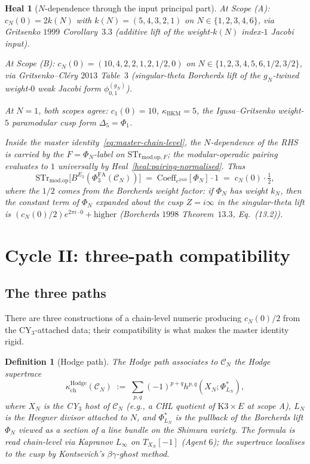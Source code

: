 \documentclass[11pt]{amsart}
\newtheorem{definition}[theorem]{Definition}
\newtheorem{heal}[theorem]{Heal}
\providecommand{\cC}{\mathcal{C}}
\providecommand{\PhiFA}{\Phi^{\mathrm{FA}}}
\providecommand{\STr}{\mathrm{STr}}
\providecommand{\modop}{\mathrm{mod.op}}
\providecommand{\kBKM}{\kappa_{\mathrm{BKM}}}
\providecommand{\kch}{\kappa_{\mathrm{ch}}}
\begin{document}
\begin{heal}[$N$-dependence through the input principal part]
\label{heal:n-dependence}
At Scope (A): $c_N(0) = 2 k(N)$ with $k(N) = (5, 4, 3, 2, 1)$ on
$N \in \{1, 2, 3, 4, 6\}$, via Gritsenko $1999$ Corollary~$3.3$
(additive lift of the weight-$k(N)$ index-$1$ Jacobi input).

At Scope (B): $c_N(0) = (10, 4, 2, 2, 1, 2, 1/2, 0)$ on
$N \in \{1, 2, 3, 4, 5, 6, 1/2, 3/2\}$, via Gritsenko--Cl\'ery
$2013$ Table~$3$ (singular-theta Borcherds lift of the
$g_N$-twined weight-$0$ weak Jacobi form $\phi^{(g_N)}_{0, 1}$).

At $N = 1$, both scopes agree: $c_1(0) = 10$, $\kBKM = 5$, the
Igusa--Gritsenko weight-$5$ paramodular cusp form $\Delta_5 =
\Phi_1$.

Inside the master identity~\eqref{eq:master-chain-level}, the
$N$-dependence of the RHS is carried by the $F = \Phi_N$-label on
$\STr_{\modop, F}$; the modular-operadic pairing evaluates to $1$
universally by Heal~\ref{heal:pairing-normalised}. Thus
\[
 \STr_{\modop}\bigl[B^{E_3}(\PhiFA_3(\cC_N))\bigr] \;=\;
 \mathrm{Coeff}_{e^{2\pi i 0}}[\Phi_N] \cdot 1
 \;=\; c_N(0) \cdot \tfrac{1}{2},
\]
where the $1/2$ comes from the Borcherds weight factor: if $\Phi_N$
has weight $k_N$, then the constant term of $\Phi_N$ expanded about
the cusp $Z = i\infty$ in the singular-theta lift is
$(c_N(0)/2) e^{2\pi i \cdot 0} + \text{higher}$ (Borcherds $1998$
Theorem~$13.3$, Eq.~(13.2)).
\end{heal}

\section{Cycle II: three-path compatibility}
\label{sec:cycle-2-three-path}

\subsection{The three paths}

There are three constructions of a chain-level numeric producing
$c_N(0)/2$ from the CY$_3$-attached data; their compatibility is what
makes the master identity rigid.

\begin{definition}[Hodge path]
\label{def:hodge-path}
The \emph{Hodge path} associates to $\cC_N$ the Hodge supertrace
\[
 \kch^{\mathrm{Hodge}}(\cC_N) \;:=\; \sum_{p, q} (-1)^{p + q}
 h^{p, q}(X_N; \Phi^*_{L_N}),
\]
where $X_N$ is the CY$_3$ host of $\cC_N$ (e.g., a CHL quotient of
$\mathrm{K3} \times E$ at scope A), $L_N$ is the Heegner divisor
attached to $N$, and $\Phi^*_{L_N}$ is the pullback of the Borcherds
lift $\Phi_N$ viewed as a section of a line bundle on the Shimura
variety. The formula is read chain-level via Kapranov $L_\infty$ on
$T_{X_N}[-1]$ (Agent $6$); the supertrace localises to the cusp by
Kontsevich's $\beta\gamma$-ghost method.
\end{definition}
\end{document}
